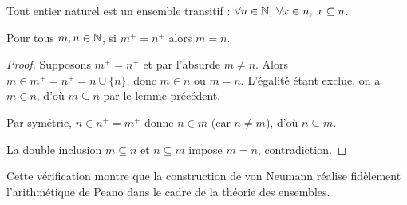 \begin{corollaire}\label{ens : naturels : transitivité}
    Tout entier naturel est un ensemble transitif : $\forall n \in \mathbb{N}, \: \forall x \in n, \: x \subseteq n$.
\end{corollaire}

\begin{lemme}
	Pour tous $m, n \in \mathbb{N}$, si $m^+=n^+$ alors $m=n$.
\end{lemme}

\begin{proof}
	Supposons $m^+=n^+$ et par l'absurde $m\neq n$. Alors $m \in m^+ = n^+ = n\cup\{n\}$, donc $m \in n$ ou $m = n$. L'égalité étant exclue, on a $m \in n$, d'où $m \subseteq n$ par le lemme précédent.
    
    Par symétrie, $n \in n^+ = m^+$ donne $n \in m$ (car $n \neq m$), d'où $n \subseteq m$.
    
    La double inclusion $m \subseteq n$ et $n \subseteq m$ impose $m = n$, contradiction.
\end{proof}

\begin{remarque}
Cette vérification montre que la construction de von Neumann réalise fidèlement l'arithmétique de Peano dans le cadre de la théorie des ensembles.
\end{remarque}
